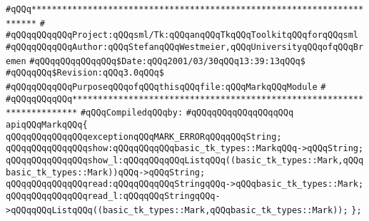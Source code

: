 \label{src/lib/tk/src/mark.api}
\verb|#qQQq***********************************************************************|\newline
\verb|#|\newline
\verb|#qQQqqQQqqQQqProject:qQQqsml/Tk:qQQqanqQQqTkqQQqToolkitqQQqforqQQqsml|\newline
\verb|#qQQqqQQqqQQqAuthor:qQQqStefanqQQqWestmeier,qQQqUniversityqQQqofqQQqBremen|\newline
\verb|#qQQqqQQqqQQqqQQq$Date:qQQq2001/03/30qQQq13:39:13qQQq$|\newline
\verb|#qQQqqQQq$Revision:qQQq3.0qQQq$|\newline
\verb|#qQQqqQQqqQQqPurposeqQQqofqQQqthisqQQqfile:qQQqMarkqQQqModule|\newline
\verb|#|\newline
\verb|#qQQqqQQqqQQq***********************************************************************|\newline
\newline
\verb|#qQQqCompiledqQQqby:|\newline
\verb|#qQQqqQQqqQQqqQQqqQQq|\newline
\newline
\verb|apiqQQqMarkqQQq{|\newline
\newline
\verb|qQQqqQQqqQQqqQQqexceptionqQQqMARK_ERRORqQQqqQQqString;|\newline
\newline
\verb|qQQqqQQqqQQqqQQqshow:qQQqqQQqqQQqbasic_tk_types::MarkqQQq->qQQqString;|\newline
\verb|qQQqqQQqqQQqqQQqshow_l:qQQqqQQqqQQqListqQQq((basic_tk_types::Mark,qQQqbasic_tk_types::Mark))qQQq->qQQqString;|\newline
\newline
\verb|qQQqqQQqqQQqqQQqread:qQQqqQQqqQQqStringqQQq->qQQqbasic_tk_types::Mark;|\newline
\verb|qQQqqQQqqQQqqQQqread_l:qQQqqQQqStringqQQq->qQQqqQQqListqQQq((basic_tk_types::Mark,qQQqbasic_tk_types::Mark));|\newline
\newline
\verb|};|\newline

